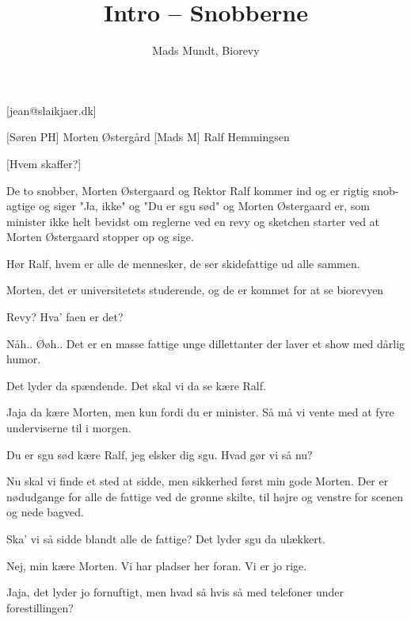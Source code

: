 \documentclass[a4paper,12pt]{article}
\title{Intro -- Snobberne}
\author{Mads Mundt, Biorevy}
\begin{document}
\maketitle

\begin{texxers}
	[jean@slaikjaer.dk]
\end{texxers}

\begin{roles}
	[Søren PH] Morten Østergård
	[Mads M] Ralf Hemmingsen
\end{roles}


\begin{props}
	[Hvem skaffer?] 
\end{props}



\begin{sketch}

\scene De to snobber, Morten Østergaard og Rektor Ralf kommer ind og
er rigtig snob-agtige og siger "Ja, ikke" og "Du er sgu sød" og Morten
Østergaard er, som minister ikke helt bevidst om reglerne ved en revy
og sketchen starter ved at Morten Østergaard stopper op og sige.

 Hør Ralf, hvem er alle de mennesker, de ser skidefattige ud alle sammen.

 Morten, det er universitetets studerende, og de er kommet for at se biorevyen

 Revy? Hva' faen er det?

 Nåh.. Øøh.. Det er en masse fattige unge dillettanter der laver et show med dårlig humor.

 Det lyder da spændende. Det skal vi da se kære Ralf.

 Jaja da kære Morten, men kun fordi du er minister. Så må vi
vente med at fyre underviserne til i morgen.

 Du er sgu sød kære Ralf, jeg elsker dig sgu. Hvad gør vi så nu?

 Nu skal vi finde et sted at sidde, men sikkerhed først min
gode Morten. Der er nødudgange for alle de fattige ved de grønne
skilte, til højre og venstre for scenen og nede bagved.

 Ska' vi så sidde blandt alle de fattige? Det lyder sgu da
ulækkert.

 Nej, min kære Morten. Vi har pladser her foran. Vi er jo rige.

 Jaja, det lyder jo fornuftigt, men hvad så hvis så med telefoner under forestillingen?


\end{sketch}
\end{document}
